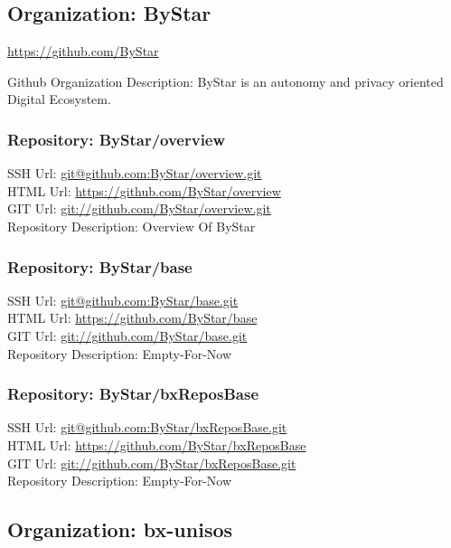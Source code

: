 \subsection{Organization: ByStar}

\url{https://github.com/ByStar}

Github Organization Description: ByStar is an autonomy and privacy oriented Digital Ecosystem.

\subsubsection{Repository: ByStar/overview}

SSH Url:  \url{git@github.com:ByStar/overview.git}\\
HTML Url: \url{https://github.com/ByStar/overview}\\
GIT Url:  \url{git://github.com/ByStar/overview.git}\\


Repository Description: Overview Of ByStar

\subsubsection{Repository: ByStar/base}

SSH Url:  \url{git@github.com:ByStar/base.git}\\
HTML Url: \url{https://github.com/ByStar/base}\\
GIT Url:  \url{git://github.com/ByStar/base.git}\\


Repository Description: Empty-For-Now

\subsubsection{Repository: ByStar/bxReposBase}

SSH Url:  \url{git@github.com:ByStar/bxReposBase.git}\\
HTML Url: \url{https://github.com/ByStar/bxReposBase}\\
GIT Url:  \url{git://github.com/ByStar/bxReposBase.git}\\


Repository Description: Empty-For-Now

\subsection{Organization: bx-unisos}

